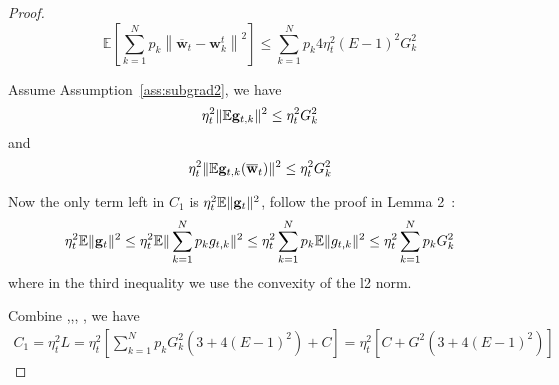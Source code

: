 \begin{proof}
\begin{equation}
\mathbb{E}\left[\sum_{k=1}^{N} p_{k}\left\|\overline{\mathbf{w}}_{t}-\mathbf{w}_{k}^{t}\right\|^{2}\right] \leq \sum_{k=1}^N p_k4 \eta_{t}^{2}(E-1)^{2} G_k^{2}
	\label{eq:g4}
\end{equation}


Assume Assumption~\ref{ass:subgrad2}, we have 
\begin{equation}
	\eta_t^2 \|\mathbb{E} {\mathbf{g}}_{t,k}\|^2 \leq  \eta_t^2 G_k^2
	\label{eq:g3}
\end{equation}
and
\begin{equation}
	\eta_t^2 \|\mathbb{E} {\mathbf{g}}_{t,k}(\overline{{\mathbf{w}}}_t)\|^2 \leq  \eta_t^2 G_k^2
	\label{eq:g2}
\end{equation}


Now the only term left in $C_1$ is $\eta_{t}^{2} \mathbb{E}\| {\mathbf{g}}_{t} \|^{2} $, follow the proof in Lemma 2~\cite{li2019convergence}: 
\begin{align}
	  \eta_{t}^{2} \mathbb{E}\| {\mathbf{g}}_{t} \|^{2} 
	\leq   \eta_{t}^{2} \mathbb{E}\| \sum_{k=1}^N p_k g_{t,k} \|^{2} 
	\leq   \eta_{t}^{2} \sum_{k=1}^N p_k \mathbb{E}\| g_{t,k} \|^{2} 
	\leq   \eta_{t}^{2} \sum_{k=1}^N p_k G_k^2  \label{eq:g1}
\end{align}
where in the third inequality we use the convexity of the l2 norm.

Combine \eq{\ref{eq:g4}},\eq{\ref{eq:g3}},\eq{\ref{eq:g2}}, \eq{\ref{eq:g1}},
we have 
\begin{align}
C_1 = \eta_t^2 L  = \eta_t^2 [\sum_{k=1}^N p_k G_k^2 \left(3 + 4(E-1)^2\right) + C]  = \eta_t^2 [C+ G^2 \left(3 + 4(E-1)^2\right)]
\end{align}

\end{proof}
